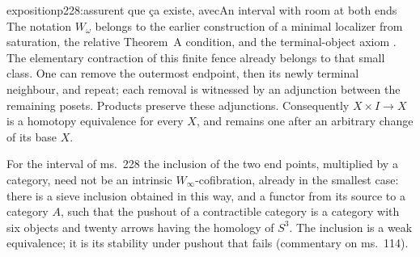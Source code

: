 \begin{dcomment}{exposition}{p228:assurent que ça existe, avec}{An interval with room at both ends}
The notation $W_\omega$ belongs to the earlier construction of a minimal localizer from saturation, the relative Theorem~A condition, and the terminal-object axiom \citep[manuscript p.~14]{Grothendieck1990XIIa}. The elementary contraction of this finite fence already belongs to that small class. One can remove the outermost endpoint, then its newly terminal neighbour, and repeat; each removal is witnessed by an adjunction between the remaining posets. Products preserve these adjunctions. Consequently $X\times I\to X$ is a homotopy equivalence for every $X$, and remains one after an arbitrary change of its base $X$.

For the interval of ms.~228 the inclusion of the two end points, multiplied by a category, need not be an intrinsic $W_\infty$-cofibration, already in the smallest case: there is a sieve inclusion obtained in this way, and a functor from its source to a category $A$, such that the pushout of a contractible category is a category with six objects and twenty arrows having the homology of $S^3$. The inclusion is a weak equivalence; it is its stability under pushout that fails (commentary on ms.~114).
\end{dcomment}

